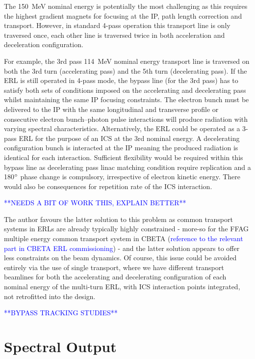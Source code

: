 \documentclass[../main.tex]{subfiles}
\begin{document}
The 150~\si{\mega\electronvolt} nominal energy is potentially the most challenging as this requires the highest gradient magnets for focusing at the IP, path length correction and transport. However, in standard 4-pass operation this transport line is only traversed once, each other line is traversed twice in both acceleration and deceleration configuration.

For example, the 3rd pass 114~\si{\mega\electronvolt} nominal energy transport line is traversed on both the 3rd turn (accelerating pass) and the 5th turn (decelerating pass). If the ERL is still operated in 4-pass mode, the bypass line (for the 3rd pass) has to satisfy both sets of conditions imposed on the accelerating and decelerating pass whilst maintaining the same IP focusing constraints. The electron bunch must be delivered to the IP with the same longitudinal and transverse profile or consecutive electron bunch--photon pulse interactions will produce radiation with varying spectral characteristics. Alternatively, the ERL could be operated as a 3-pass ERL for the purpose of an ICS at the 3rd nominal energy. A decelerating configuration bunch is interacted at the IP meaning the produced radiation is identical for each interaction. Sufficient flexibility would be required within this bypass line as decelerating pass linac matching condition require replication and a 180$\degree$ phase change  is compulsory, irrespective of electron kinetic energy. There would also be consequences for repetition rate of the ICS interaction.   

\textcolor{blue}{**NEEDS A BIT OF WORK THIS, EXPLAIN BETTER**}

The author favours the latter solution to this problem as common transport systems in ERLs are already typically highly constrained - more-so for the FFAG multiple energy common transport system in CBETA  (\textcolor{blue}{reference to the relevant part in CBETA ERL commissioning}) - and the latter solution appears to offer less constraints on the beam dynamics. Of course, this issue could be avoided entirely via the use of single transport, where we have different transport beamlines for both the accelerating and decelerating configuration of each nominal energy of the multi-turn ERL, with ICS interaction points integrated, not retrofitted into the design.     

\textcolor{blue}{**BYPASS TRACKING STUDIES**}

\section{Spectral Output}
\end{document}
